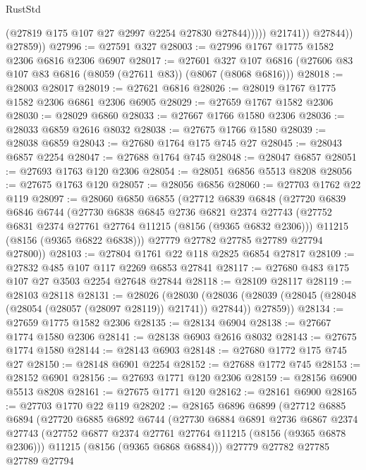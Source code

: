\begin{lexlean}{RustStd}
\begin{coremodule}
                        (@27819 @175 @107 @27 @2997 @2254 @27830 @27844)))))
                @21741))
            @27844))
        @27859))
@27996 := @27591 @327
@28003 := @27996 @1767 @1775 @1582 @2306 @6816 @2306 @6907
@28017 := @27601
    @327
    @107
    @6816
    (@27606 @83 @107 @83 @6816 (@8059 (@27611 @83)) (@8067 (@8068 @6816)))
@28018 := @28003 @28017
@28019 := @27621 @6816
@28026 := @28019 @1767 @1775 @1582 @2306 @6861 @2306 @6905
@28029 := @27659 @1767 @1582 @2306
@28030 := @28029 @6860
@28033 := @27667 @1766 @1580 @2306
@28036 := @28033 @6859 @2616 @8032
@28038 := @27675 @1766 @1580
@28039 := @28038 @6859
@28043 := @27680 @1764 @175 @745 @27
@28045 := @28043 @6857 @2254
@28047 := @27688 @1764 @745
@28048 := @28047 @6857
@28051 := @27693 @1763 @120 @2306
@28054 := @28051 @6856 @5513 @8208
@28056 := @27675 @1763 @120
@28057 := @28056 @6856
@28060 := @27703 @1762 @22 @119
@28097 := @28060
    @6850
    @6855
    (@27712
      @6839
      @6848
      (@27720
        @6839
        @6846
        @6744
        (@27730
          @6838
          @6845
          @2736
          @6821
          @2374
          @27743
          (@27752 @6831 @2374 @27761 @27764 @11215 (@8156 (@9365 @6832 @2306)))
          @11215
          (@8156 (@9365 @6822 @6838)))
        @27779
        @27782
        @27785
        @27789
        @27794
        @27800))
@28103 := @27804 @1761 @22 @118 @2825 @6854 @27817
@28109 := @27832 @485 @107 @117 @2269 @6853 @27841
@28117 := @27680 @483 @175 @107 @27 @3503 @2254 @27648 @27844
@28118 := @28109 @28117
@28119 := @28103 @28118
@28131 := @28026
    (@28030
      (@28036 (@28039 (@28045 (@28048 (@28054 (@28057 (@28097 @28119)) @21741)) @27844)) @27859))
@28134 := @27659 @1775 @1582 @2306
@28135 := @28134 @6904
@28138 := @27667 @1774 @1580 @2306
@28141 := @28138 @6903 @2616 @8032
@28143 := @27675 @1774 @1580
@28144 := @28143 @6903
@28148 := @27680 @1772 @175 @745 @27
@28150 := @28148 @6901 @2254
@28152 := @27688 @1772 @745
@28153 := @28152 @6901
@28156 := @27693 @1771 @120 @2306
@28159 := @28156 @6900 @5513 @8208
@28161 := @27675 @1771 @120
@28162 := @28161 @6900
@28165 := @27703 @1770 @22 @119
@28202 := @28165
    @6896
    @6899
    (@27712
      @6885
      @6894
      (@27720
        @6885
        @6892
        @6744
        (@27730
          @6884
          @6891
          @2736
          @6867
          @2374
          @27743
          (@27752 @6877 @2374 @27761 @27764 @11215 (@8156 (@9365 @6878 @2306)))
          @11215
          (@8156 (@9365 @6868 @6884)))
        @27779
        @27782
        @27785
        @27789
        @27794

\end{coremodule}
\end{lexlean}
